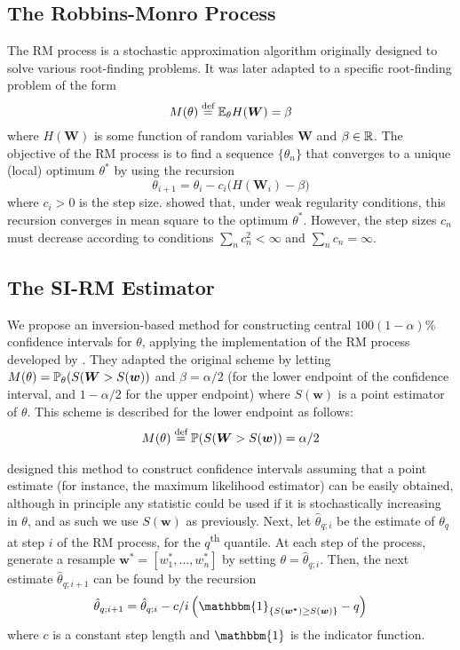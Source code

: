 \subsection{The Robbins-Monro Process}

The RM process is a stochastic approximation algorithm originally designed to solve various root-finding problems. It was later adapted to a specific root-finding problem of the form \cite{Fu2015} \[
M(\theta) \overset{\text{def}}{=} \mathbb{E}_\theta H(\bm{W}) = \beta
\] where $H(\bm{W})$ is some function of random variables $\bm{W}$ and $\beta \in \mathbb{R}$. The objective of the RM process is to find a sequence $\{\theta_n\}$ that converges to a unique (local) optimum $\theta^*$ by using the recursion \cite{LlyodBotev2015}
\[ \theta_{i+1} = \theta_i - c_i \Big( H(\bm{W}_i) - \beta \Big) \]
where $c_i > 0$ is the step size. \citet{RobbinsMonro1951} showed that, under weak regularity conditions, this recursion converges in mean square to the optimum $\theta^*$. However, the step sizes $c_n$ must decrease according to conditions $\sum_nc_n^2 < \infty$ and $\sum_n c_n = \infty$.

\subsection{The SI-RM Estimator}

We propose an inversion-based method for constructing central $100(1-\alpha)\%$ confidence intervals for $\theta$, applying the implementation of the RM process developed by \citet{Garthwaite1992}. They adapted the original scheme by letting $M(\theta) = \mathbb{P}_\theta(S(\bm{W} > S(\bm{w}))$ and $\beta = \alpha/2$ (for the lower endpoint of the confidence interval, and $1-\alpha/2$ for the upper endpoint) where $S(\bm{w})$ is a point estimator of $\theta$. This scheme is described for the lower endpoint as follows:
\begin{align*}
    M(\theta) \overset{\text{def}}{=} \mathbb{P}(S(\bm{W} > S(\bm{w})) = \alpha/2
\end{align*}

\citet{Garthwaite1992} designed this method to construct confidence intervals assuming that a point estimate (for instance, the maximum likelihood estimator) can be easily obtained, although in principle any statistic could be used if it is stochastically increasing in $\theta$, and as such we use $S(\bm{w})$ as previously. Next, let $\hat\theta_{q; i}$ be the estimate of $\theta_q$ at step $i$ of the RM process, for the $q$\textsuperscript{th} quantile. At each step of the process, generate a resample $\bm{w}^* = [w_1^*, \dots, w_n^*]$ by setting $\theta = \hat\theta_{q; i}$. Then, the next estimate $\hat\theta_{q; i+1}$ can be found by the recursion
\begin{equation}\label{eqn: SIRM-recursion}
    \hat\theta_{q; i+1} = \hat\theta_{q; i} - c/i \left( \mathbbm{1}_{\{S(\bm{w^*}) \geq S(\bm{w})\}} - q \right)
\end{equation}
where $c$ is a constant step length and $\mathbbm{1}$ is the indicator function.

